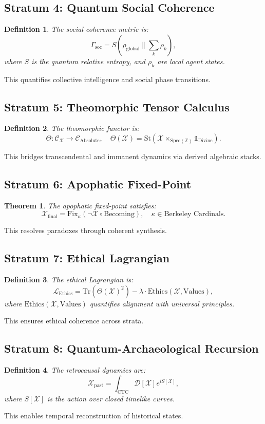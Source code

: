 \documentclass[11pt]{article}
\newtheorem{theorem}{Theorem}
\newtheorem{definition}{Definition}
\newcommand{\Xi}{\mathcal{X}}
\newcommand{\Z}{\mathbb{Z}}
\newcommand{\St}{\mathrm{St}}
\newcommand{\Tr}{\mathrm{Tr}}
\newcommand{\Fix}{\mathrm{Fix}}
\newcommand{\Ethics}{\mathrm{Ethics}}
\begin{document}
\subsection{Stratum 4: Quantum Social Coherence}
\begin{definition}
The \emph{social coherence metric} is:
\[
\Gamma_{\text{soc}} = S(\rho_{\text{global}} \| \sum_k \rho_k),
\]
where $S$ is the quantum relative entropy, and $\rho_k$ are local agent states.
\end{definition}
This quantifies collective intelligence and social phase transitions.

\subsection{Stratum 5: Theomorphic Tensor Calculus}
\begin{definition}
The \emph{theomorphic functor} is:
\[
\Theta: \mathcal{C}_{\Xi} \to \mathcal{C}_{\text{Absolute}}, \quad \Theta(\Xi) = \St(\Xi \times_{\text{Spec}(\Z)} \mathbb{1}_{\text{Divine}}).
\]
\end{definition}
This bridges transcendental and immanent dynamics via derived algebraic stacks.

\subsection{Stratum 6: Apophatic Fixed-Point}
\begin{theorem}
The \emph{apophatic fixed-point} satisfies:
\[
\Xi_{\text{final}} = \Fix_{\kappa}(\neg \Xi \circ \text{Becoming}), \quad \kappa \in \text{Berkeley Cardinals}.
\]
\end{theorem}
This resolves paradoxes through coherent synthesis.

\subsection{Stratum 7: Ethical Lagrangian}
\begin{definition}
The \emph{ethical Lagrangian} is:
\[
\mathcal{L}_{\text{Ethics}} = \Tr(\Theta(\Xi)^2) - \lambda \cdot \Ethics(\Xi, \text{Values}),
\]
where $\Ethics(\Xi, \text{Values})$ quantifies alignment with universal principles.
\end{definition}
This ensures ethical coherence across strata.

\subsection{Stratum 8: Quantum-Archaeological Recursion}
\begin{definition}
The \emph{retrocausal dynamics} are:
\[
\Xi_{\text{past}} = \int_{\text{CTC}} \mathcal{D}[\Xi] e^{i S[\Xi]},
\]
where $S[\Xi]$ is the action over closed timelike curves.
\end{definition}
This enables temporal reconstruction of historical states.
\end{document}
